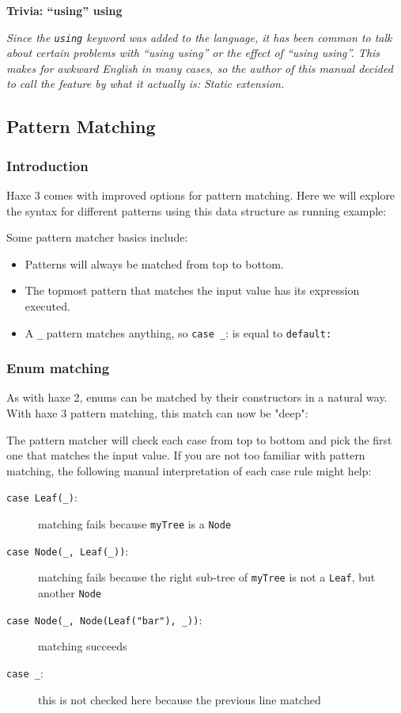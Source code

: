 \documentclass{article}
\newcommand{\expr}[1]{\texttt{#1}}
\newenvironment{myshaded}
  {\def\FrameCommand{\fboxsep=\topsep\colorbox{bgcolor}}%
  \MakeFramed {\advance\hsize-\width \FrameRestore}}%
 {\endMakeFramed}
\newcommand{\trivia}[2]
	{\begin{myshaded}\noindent\textbf{Trivia: #1}\par\nobreak\noindent\ignorespaces\textit{#2}\end{myshaded}}
\begin{document}
\trivia{``using'' using}{Since the \expr{using} keyword was added to the language, it has been common to talk about certain problems with ``using using'' or the effect of ``using using''. This makes for awkward English in many cases, so the author of this manual decided to call the feature by what it actually is: Static extension.}



\subsection{Pattern Matching}
\label{Pattern Matching}

\subsubsection{Introduction}

Haxe 3 comes with improved options for pattern matching. Here we will explore the syntax for different patterns using this data structure as running example:



Some pattern matcher basics include:

\begin{itemize}
	\item Patterns will always be matched from top to bottom.
	\item The topmost pattern that matches the input value has its expression executed.
	\item A \expr{_} pattern matches anything, so \expr{case _}: is equal to \expr{default:}
\end{itemize}

\subsubsection{Enum matching}

As with haxe 2, enums can be matched by their constructors in a natural way. With haxe 3 pattern matching, this match can now be "deep":



The pattern matcher will check each case from top to bottom and pick the first one that matches the input value. If you are not too familiar with pattern matching, the following manual interpretation of each case rule might help:

\begin{description}
	\item[\expr{case Leaf(_)}:] matching fails because \expr{myTree} is a \expr{Node}
	\item[\expr{case Node(_, Leaf(_))}:] matching fails because the right sub-tree of \expr{myTree} is not a \expr{Leaf}, but another \expr{Node}
	\item[\expr{case Node(_, Node(Leaf("bar"), _))}:] matching succeeds
	\item[\expr{case _}:] this is not checked here because the previous line matched
\end{description}
\end{document}
